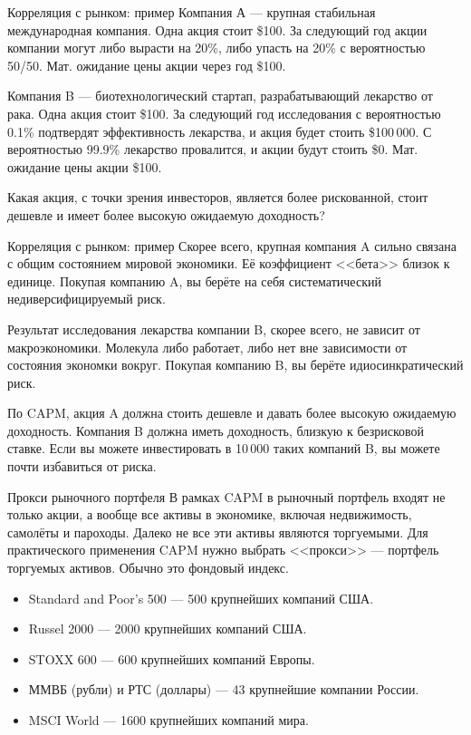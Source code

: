 \documentclass{beamer}
\begin{document}
\begin{frame}{Корреляция с рынком: пример}
\justify
Компания А --- крупная стабильная международная компания. Одна акция стоит \$100. За 
следующий год акции компании могут либо вырасти на 20\%, либо упасть на 20\% с 
вероятностью 50/50. Мат. ожидание цены акции через год \$100.

\justify
Компания B --- биотехнологический стартап, разрабатывающий лекарство от рака. Одна 
акция стоит \$100. За следующий год исследования с вероятностью 0.1\% подтвердят 
эффективность лекарства, и акция будет стоить \$100\,000. С вероятностью 99.9\% 
лекарство провалится, и акции будут стоить \$0. Мат. ожидание цены акции \$100.

\justify
Какая акция, с точки зрения инвесторов, является более рискованной, стоит дешевле
и имеет более высокую ожидаемую доходность?
\end{frame}



\begin{frame}{Корреляция с рынком: пример}
\justify
Скорее всего, крупная компания A сильно связана с общим состоянием мировой экономики.
Её коэффициент <<бета>> близок к единице. Покупая компанию A, вы берёте на себя
систематический недиверсифицируемый риск.

\justify
Результат исследования лекарства компании B, скорее всего, не зависит от 
макроэкономики. Молекула либо работает, либо нет вне зависимости от состояния экономки
вокруг. Покупая компанию B, вы берёте идиосинкратический риск.

\justify
По CAPM, акция A должна стоить дешевле и давать более высокую ожидаемую доходность. 
Компания B должна иметь доходность, близкую к безрисковой ставке. Если вы можете 
инвестировать в 10\,000 таких компаний B, вы можете почти избавиться от риска.
\end{frame}



\begin{frame}{Прокси рыночного портфеля}
\justify
В рамках CAPM в рыночный портфель входят не только акции, а вообще все активы в экономике, включая недвижимость, самолёты и пароходы. Далеко не все эти активы являются торгуемыми. Для практического применения CAPM нужно выбрать <<прокси>> --- портфель торгуемых активов. Обычно это фондовый индекс.

\vspace{\baselineskip}
\begin{itemize}
\justifying
\item Standard and Poor's 500 --- 500 крупнейших компаний США.
\item Russel 2000 --- 2000 крупнейших компаний США.
\item STOXX 600 --- 600 крупнейших компаний Европы.
\item ММВБ (рубли) и РТС (доллары) --- 43 крупнейшие компании России.
\item MSCI World --- 1600 крупнейших компаний мира.
\end{itemize}
\end{frame}
\end{document}

